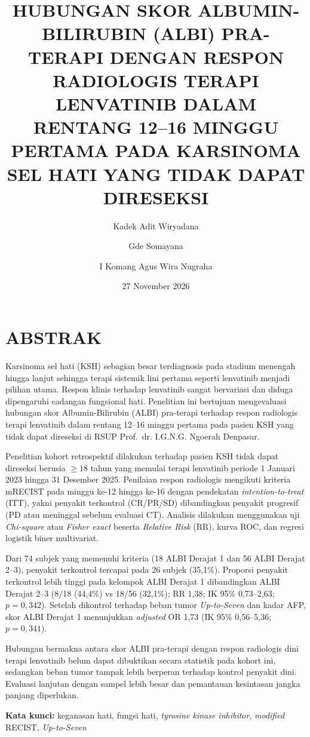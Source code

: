 \documentclass[
  indonesian,
]{report}
\title{HUBUNGAN SKOR ALBUMIN-BILIRUBIN (ALBI) PRA-TERAPI DENGAN RESPON
RADIOLOGIS TERAPI LENVATINIB DALAM RENTANG 12--16 MINGGU PERTAMA PADA
KARSINOMA SEL HATI YANG TIDAK DAPAT DIRESEKSI}
\author{Kadek Adit Wiryadana \and Gde Somayana \and I Komang Agus Wira
Nugraha}
\date{27 November 2026}
\begin{document}
\maketitle


\chapter*{ABSTRAK}\label{abstrak}

Karsinoma sel hati (KSH) sebagian besar terdiagnosis pada stadium
menengah hingga lanjut sehingga terapi sistemik lini pertama seperti
lenvatinib menjadi pilihan utama. Respon klinis terhadap lenvatinib
sangat bervariasi dan diduga dipengaruhi cadangan fungsional hati.
Penelitian ini bertujuan mengevaluasi hubungan skor Albumin-Bilirubin
(ALBI) pra-terapi terhadap respon radiologis terapi lenvatinib dalam
rentang 12--16 minggu pertama pada pasien KSH yang tidak dapat direseksi
di RSUP Prof.~dr. I.G.N.G. Ngoerah Denpasar.

Penelitian kohort retrospektif dilakukan terhadap pasien KSH tidak dapat
direseksi berusia \(\ge 18\) tahun yang memulai terapi lenvatinib
periode 1 Januari 2023 hingga 31 Desember 2025. Penilaian respon
radiologis mengikuti kriteria mRECIST pada minggu ke-12 hingga ke-16
dengan pendekatan \emph{intention-to-treat} (ITT), yakni penyakit
terkontrol (CR/PR/SD) dibandingkan penyakit progresif (PD atau meninggal
sebelum evaluasi CT). Analisis dilakukan menggunakan uji
\emph{Chi-square} atau \emph{Fisher exact} beserta \emph{Relative Risk}
(RR), kurva ROC, dan regresi logistik biner multivariat.

Dari 74 subjek yang memenuhi kriteria (18 ALBI Derajat 1 dan 56 ALBI
Derajat 2--3), penyakit terkontrol tercapai pada 26 subjek (35,1\%).
Proporsi penyakit terkontrol lebih tinggi pada kelompok ALBI Derajat 1
dibandingkan ALBI Derajat 2--3 (8/18 (44,4\%) vs 18/56 (32,1\%); RR
1,38; IK 95\% 0,73--2,63; \(p = 0,342\)). Setelah dikontrol terhadap
beban tumor \emph{Up-to-Seven} dan kadar AFP, skor ALBI Derajat 1
menunjukkan \emph{adjusted} OR 1,73 (IK 95\% 0,56--5,36; \(p = 0,341\)).

Hubungan bermakna antara skor ALBI pra-terapi dengan respon radiologis
dini terapi lenvatinib belum dapat dibuktikan secara statistik pada
kohort ini, sedangkan beban tumor tampak lebih berperan terhadap kontrol
penyakit dini. Evaluasi lanjutan dengan sampel lebih besar dan
pemantauan kesintasan jangka panjang diperlukan.

\textbf{Kata kunci:} keganasan hati, fungsi hati, \emph{tyrosine kinase
inhibitor}, \emph{modified} RECIST, \emph{Up-to-Seven}
\end{document}
